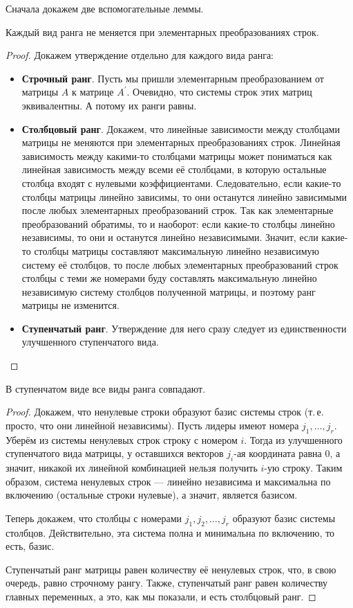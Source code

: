 Сначала докажем две вспомогательные леммы.

\begin{lemma}
    Каждый вид ранга не меняется при элементарных преобразованиях строк.
\end{lemma}

\begin{proof}
    Докажем утверждение отдельно для каждого вида ранга:
    \begin{itemize}
        \item \textbf{Строчный ранг}. Пусть мы пришли элементарным преобразованием от матрицы $A$ к матрице $A^\prime$. Очевидно, что системы строк этих матриц эквивалентны. А потому их ранги равны.
        \item \textbf{Столбцовый ранг}. Докажем, что линейные зависимости между столбцами матрицы не меняются при элементарных преобразованиях строк. Линейная зависимость между какими-то столбцами матрицы может пониматься как линейная зависимость между всеми её столбцами, в которую остальные столбца входят с нулевыми коэффициентами. Следовательно, если какие-то столбцы матрицы линейно зависимы, то они останутся линейно зависимыми после любых элементарных преобразований строк. Так как элементарные преобразований обратимы, то и наоборот: если какие-то столбцы линейно независимы, то они и останутся линейно независимыми. Значит, если какие-то столбцы матрицы составляют максимальную линейно независимую систему её столбцов, то после любых элементарных преобразований строк столбцы с теми же номерами буду составлять максимальную линейно независимую систему столбцов полученной матрицы, и поэтому ранг матрицы не изменится.
        \item \textbf{Ступенчатый ранг}. Утверждение для него сразу следует из единственности улучшенного ступенчатого вида.
    \end{itemize}
\end{proof}

\begin{lemma}
    В ступенчатом виде все виды ранга совпадают.
\end{lemma}

\begin{proof}
    Докажем, что ненулевые строки образуют базис системы строк (т.\,е. просто, что они линейной независимы). Пусть лидеры имеют номера $j_1, \ldots, j_r$. Уберём из системы ненулевых строк строку с номером $i$. Тогда из улучшенного ступенчатого вида матрицы, у оставшихся векторов $j_i$-ая координата равна $0$, а значит, никакой их линейной комбинацией нельзя получить $i$-ую строку. Таким образом, система ненулевых строк --- линейно независима и максимальна по включению (остальные строки нулевые), а значит, является базисом.
    
    Теперь докажем, что столбцы с номерами $j_1, j_2, \ldots, j_r$ образуют базис системы столбцов. Действительно, эта система полна и минимальна по включению, то есть, базис.

    Ступенчатый ранг матрицы равен количеству её ненулевых строк, что, в свою очередь, равно строчному рангу. Также, ступенчатый ранг равен количеству главных переменных, а это, как мы показали, и есть столбцовый ранг.
\end{proof}

